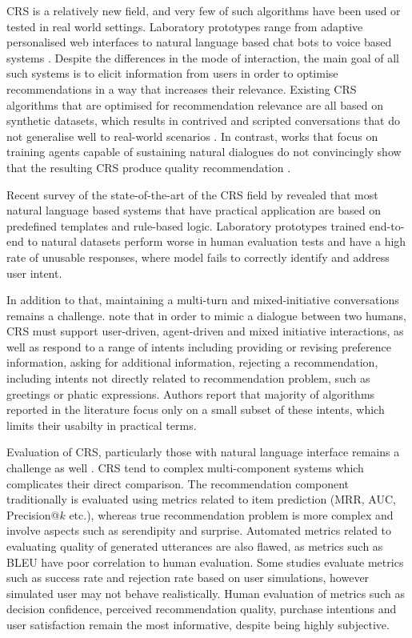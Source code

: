 CRS is a relatively new field, and very few of such algorithms have been used or tested in real world settings. Laboratory prototypes range from adaptive personalised web interfaces \citep{ayundhita2019ontology} to natural language based chat bots \citep{sun2018conversational, li2018towards} to voice based systems \citep{dalton2018vote}. Despite the differences in the mode of interaction, the main goal of all such systems is to elicit information from users in order to optimise recommendations in a way that increases their relevance. Existing CRS algorithms that are optimised for recommendation relevance are all based on synthetic datasets, which results in contrived and scripted conversations that do not generalise well to real-world scenarios \citep{jannach2021survey}. In contrast, works that focus on training agents capable of sustaining natural dialogues do not convincingly show that the resulting CRS produce quality recommendation \citep{li2018towards, kang2019recommendation}. 

Recent survey of the state-of-the-art of the CRS field by \cite{jannach2022conversational} revealed that most natural language based systems that have practical application are based on predefined templates and rule-based logic. Laboratory prototypes trained end-to-end to natural datasets perform worse in human evaluation tests and have a high rate of unusable responses, where model fails to correctly identify and address user intent.

In addition to that, maintaining a multi-turn and mixed-initiative conversations remains a challenge. \cite{jannach2022conversational} note that in order to mimic a dialogue between two humans, CRS must support user-driven, agent-driven and mixed initiative interactions, as well as respond to a range of intents including providing or revising preference information, asking for additional information, rejecting a recommendation, including intents not directly related to recommendation problem, such as greetings or phatic expressions. Authors report that majority of algorithms reported in the literature focus only on a small subset of these intents, which limits their usabilty in practical terms.

Evaluation of CRS, particularly those with natural language interface remains a challenge as well \cite{jannach2022conversational, jannach2022evaluating}. CRS tend to complex multi-component systems which complicates their direct comparison. The recommendation component traditionally is evaluated using metrics related to item prediction (MRR, AUC, Precision@$k$ etc.), whereas true recommendation problem is more complex and involve aspects such as serendipity and surprise. Automated metrics related to evaluating quality of generated utterances are also flawed, as metrics such as BLEU have poor correlation to human evaluation. Some studies evaluate metrics such as success rate and rejection rate based on user simulations, however simulated user may not behave realistically. Human evaluation of metrics such as decision confidence, perceived recommendation quality, purchase intentions and user satisfaction remain the most informative, despite being highly subjective.

